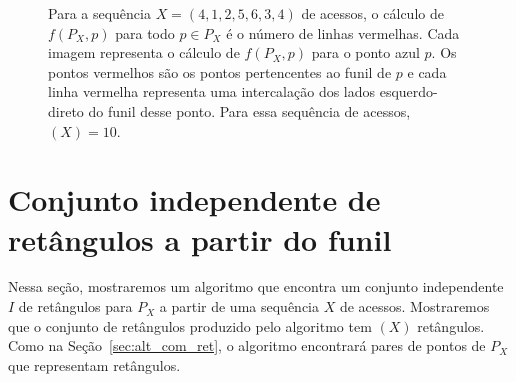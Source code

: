 \begin{figure}
    \caption{Para a sequência $X = (4,1,2,5,6,3,4)$ de acessos, o cálculo de $f(P_X,p)$ para todo $p \in P_X$ é o número de linhas vermelhas. Cada imagem representa o cálculo de $f(P_X,p)$ para o ponto azul $p$. Os pontos vermelhos são os pontos pertencentes ao funil de $p$ e cada linha vermelha representa uma intercalação dos lados esquerdo-direto do funil desse ponto. Para essa sequência de acessos, \Funil$(X) = 10$.}
\label{fig:funil-execucao}
\end{figure}

\section{Conjunto independente de retângulos a partir do funil}



Nessa seção, mostraremos um algoritmo que encontra um conjunto independente $I$ de retângulos para $P_X$ a partir de uma sequência $X$ de acessos. Mostraremos que o conjunto de retângulos produzido pelo algoritmo tem \Funil$(X)$ retângulos. Como na Seção~\ref{sec:alt_com_ret}, o algoritmo encontrará pares de pontos de $P_X$ que representam retângulos.

